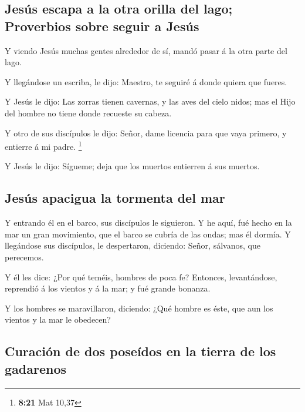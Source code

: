 \hypertarget{jesuxfas-escapa-a-la-otra-orilla-del-lago-proverbios-sobre-seguir-a-jesuxfas}{%
\subsection{Jesús escapa a la otra orilla del lago; Proverbios sobre
seguir a
Jesús}\label{jesuxfas-escapa-a-la-otra-orilla-del-lago-proverbios-sobre-seguir-a-jesuxfas}}

 Y viendo Jesús muchas gentes alrededor de sí, mandó
pasar á la otra parte del lago.

 Y llegándose un escriba, le dijo: Maestro, te seguiré á
donde quiera que fueres.

 Y Jesús le dijo: Las zorras tienen cavernas, y las aves
del cielo nidos; mas el Hijo del hombre no tiene donde recueste su
cabeza.

 Y otro de sus discípulos le dijo: Señor, dame licencia
para que vaya primero, y entierre á mi padre. \footnote{\textbf{8:21}
  Mat 10,37}

 Y Jesús le dijo: Sígueme; deja que los muertos entierren
á sus muertos.

\hypertarget{jesuxfas-apacigua-la-tormenta-del-mar}{%
\subsection{Jesús apacigua la tormenta del
mar}\label{jesuxfas-apacigua-la-tormenta-del-mar}}

 Y entrando él en el barco, sus discípulos le siguieron.
 Y he aquí, fué hecho en la mar un gran movimiento, que
el barco se cubría de las ondas; mas él dormía.  Y
llegándose sus discípulos, le despertaron, diciendo: Señor, sálvanos,
que perecemos.

 Y él les dice: ¿Por qué teméis, hombres de poca fe?
Entonces, levantándose, reprendió á los vientos y á la mar; y fué grande
bonanza.

 Y los hombres se maravillaron, diciendo: ¿Qué hombre es
éste, que aun los vientos y la mar le obedecen?

\hypertarget{curaciuxf3n-de-dos-poseuxeddos-en-la-tierra-de-los-gadarenos}{%
\subsection{Curación de dos poseídos en la tierra de los
gadarenos}\label{curaciuxf3n-de-dos-poseuxeddos-en-la-tierra-de-los-gadarenos}}

